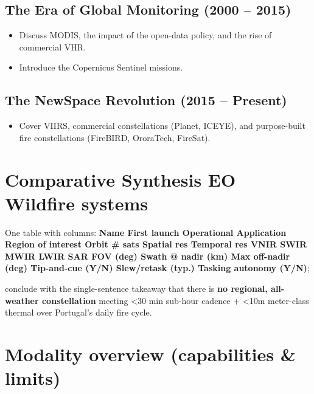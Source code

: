 \subsection{The Era of Global Monitoring (2000 --
2015)}\label{412-the-era-of-global-monitoring-2000----2015}

\begin{itemize}
\item
  Discuss MODIS, the impact of the open-data policy, and the rise of
  commercial VHR.
\item
  Introduce the Copernicus Sentinel missions.
\end{itemize}

\subsection{The NewSpace Revolution (2015 --
Present)}\label{413-the-newspace-revolution-2015----present}

\begin{itemize}
\item
  Cover VIIRS, commercial constellations (Planet, ICEYE), and
  purpose-built fire constellations (FireBIRD, OroraTech, FireSat).
\end{itemize}

\section{Comparative Synthesis EO Wildfire
systems}\label{42-comparative-synthesis-eo-wildfire-systems}

One table with columns: \textbf{Name \textbar{} First launch \textbar{}
Operational \textbar{} Application \textbar{} Region of interest
\textbar{} Orbit \textbar{} \# sats \textbar{} Spatial res \textbar{}
Temporal res \textbar{} VNIR \textbar{} SWIR \textbar{} MWIR \textbar{}
LWIR \textbar{} SAR \textbar{} FOV (deg) \textbar{} Swath @ nadir (km)
\textbar{} Max off-nadir (deg) \textbar{} Tip-and-cue (Y/N) \textbar{}
Slew/retask (typ.) \textbar{} Tasking autonomy (Y/N)};

conclude with the single-sentence takeaway that there is \textbf{no
regional, all-weather constellation} meeting \textless30 min sub-hour
cadence + \textless10m meter-class thermal over Portugal's daily fire
cycle.

\section{Modality overview (capabilities \&
limits)}\label{43-modality-overview-capabilities--limits}

